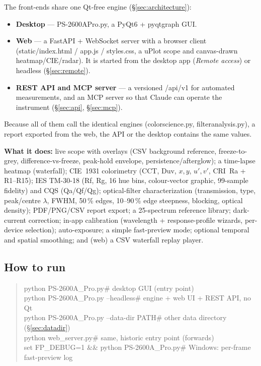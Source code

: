 \documentclass[12pt,a4paper]{article}
\DeclareRobustCommand{\code}[1]{{\ttfamily\small\def\_{\rawus\allowbreak}#1}}
\DeclareRobustCommand{\file}[1]{{\ttfamily\small\def\_{\rawus\allowbreak}#1}}
\begin{document}
\medskip
The front-ends share one Qt-free engine (\S\ref{sec:architecture}):
\begin{itemize}
  \item \textbf{Desktop} --- \file{PS-2600A\_Pro.py}, a PyQt6 + pyqtgraph GUI.
  \item \textbf{Web} --- a FastAPI + WebSocket server with a browser client
        (\file{static/index.html} / \file{app.js} / \file{styles.css}, a uPlot
        scope and canvas-drawn heatmap\slash CIE\slash radar). It is started from the
        desktop app (\emph{Remote access}) or headless (\S\ref{sec:remote}).
  \item \textbf{REST API and MCP server} --- a versioned \code{/api/v1} for
        automated measurements, and an MCP server so that Claude can operate the
        instrument (\S\ref{sec:api}, \S\ref{sec:mcp}).
\end{itemize}
Because all of them call the identical engines (\file{color\_science.py},
\file{filter\_analysis.py}), a report exported from the web, the API or the
desktop contains the same values.

\medskip
\textbf{What it does:} live scope with overlays (CSV background reference,
freeze-to-grey, difference-vs-freeze, peak-hold envelope, persistence/afterglow);
a time-lapse heatmap (waterfall); CIE~1931 colorimetry
(CCT, Duv, $x,y$, $u',v'$, CRI~Ra + R1--R15); IES TM-30-18 (Rf, Rg, 16 hue bins,
colour-vector graphic, 99-sample fidelity) and CQS (Qa/Qf/Qg); optical-filter
characterization (transmission, type, peak/centre $\lambda$, FWHM, 50\,\% edges,
10--90\,\% edge steepness, blocking, optical density); PDF/PNG/CSV report export; a
25-spectrum reference library; dark-current correction; in-app calibration
(wavelength + response-profile wizards, per-device selection); auto-exposure; a
simple fast-preview mode; optional temporal and
spatial smoothing; and (web) a CSV waterfall replay player.

\subsection{How to run}
\begin{quote}\ttfamily\small
python PS-2600A\_Pro.py\hfill\# desktop GUI (entry point)\\
python PS-2600A\_Pro.py --headless\hfill\# engine + web UI + REST API, no Qt\\
python PS-2600A\_Pro.py --data-dir PATH\hfill\# other data directory (\S\ref{sec:datadir})\\
python web\_server.py\hfill\# same, historic entry point (forwards)\\
set FP\_DEBUG=1 \&\& python PS-2600A\_Pro.py\hfill\# Windows: per-frame fast-preview log
\end{quote}
\end{document}
